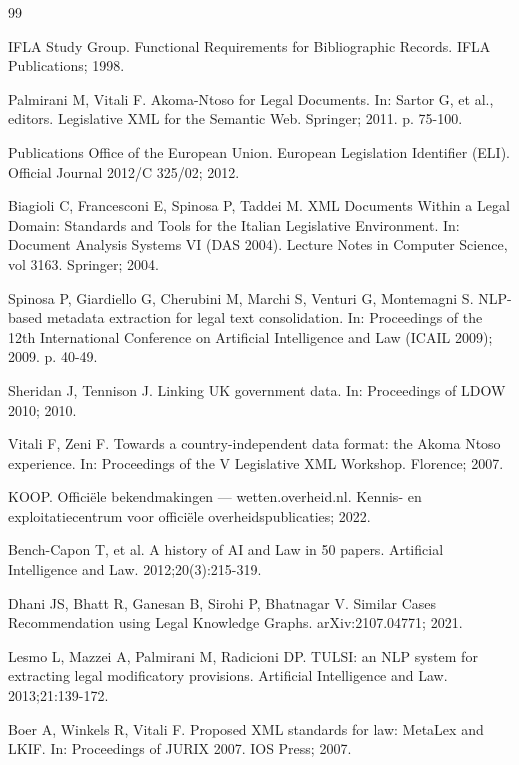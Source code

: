 \documentclass{IOS-Book-Article}
\begin{document}
\begin{thebibliography}{99}

IFLA Study Group. Functional Requirements for Bibliographic Records. IFLA Publications; 1998.

Palmirani M, Vitali F. Akoma-Ntoso for Legal Documents. In: Sartor G, et al., editors.
Legislative XML for the Semantic Web. Springer; 2011. p. 75-100.

Publications Office of the European Union. European Legislation Identifier (ELI). Official
Journal 2012/C 325/02; 2012.

Biagioli C, Francesconi E, Spinosa P, Taddei M. XML Documents Within a Legal Domain:
Standards and Tools for the Italian Legislative Environment. In: Document Analysis Systems
VI (DAS 2004). Lecture Notes in Computer Science, vol 3163. Springer; 2004.

Spinosa P, Giardiello G, Cherubini M, Marchi S, Venturi G, Montemagni S. NLP-based metadata
extraction for legal text consolidation. In: Proceedings of the 12th International Conference
on Artificial Intelligence and Law (ICAIL 2009); 2009. p. 40-49.

Sheridan J, Tennison J. Linking UK government data. In: Proceedings of LDOW 2010; 2010.

Vitali F, Zeni F. Towards a country-independent data format: the Akoma Ntoso experience. In:
Proceedings of the V Legislative XML Workshop. Florence; 2007.

KOOP. Offici\"{e}le bekendmakingen --- wetten.overheid.nl. Kennis- en exploitatiecentrum voor
offici\"{e}le overheidspublicaties; 2022.

Bench-Capon T, et al. A history of AI and Law in 50 papers. Artificial Intelligence and Law.
2012;20(3):215-319.

Dhani JS, Bhatt R, Ganesan B, Sirohi P, Bhatnagar V. Similar Cases Recommendation using Legal
Knowledge Graphs. arXiv:2107.04771; 2021.

Lesmo L, Mazzei A, Palmirani M, Radicioni DP. TULSI: an NLP system for extracting legal
modificatory provisions. Artificial Intelligence and Law. 2013;21:139-172.

Boer A, Winkels R, Vitali F. Proposed XML standards for law: MetaLex and LKIF. In:
Proceedings of JURIX 2007. IOS Press; 2007.


\end{thebibliography}
\end{document}
